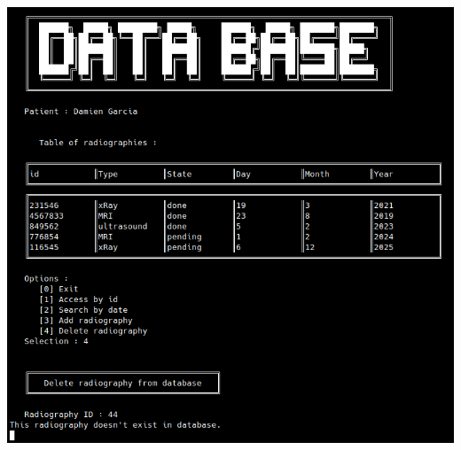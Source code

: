 \documentclass[12pt,a4paper]{article}
\newenvironment{Figure}
{\par\medskip\noindent\minipage{\linewidth}}
{\endminipage\par\medskip}
\begin{document}
\begin{multicols}{2}
		\begin{Figure}
			\centering
			\includegraphics[width=\linewidth]{images/walkthrough/doctor_patient_remove_err.png}
			\label{fig:err_del_patient}
		\end{Figure}
		

\end{multicols}
\end{document}
